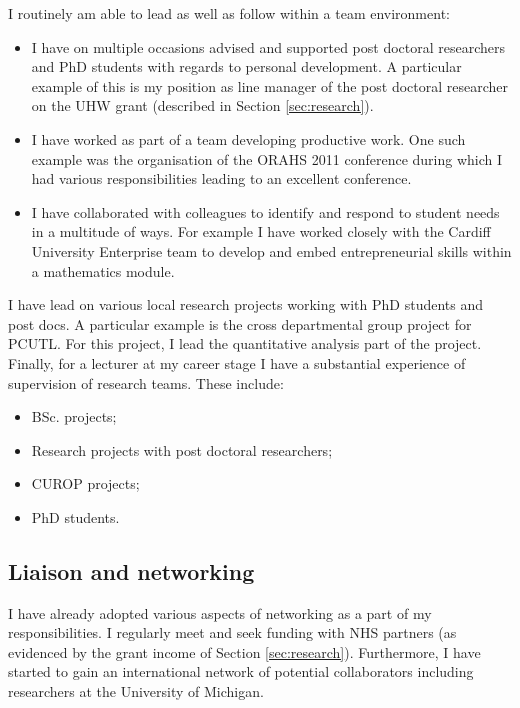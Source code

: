 \documentclass{article}
\begin{document}
I routinely am able to lead as well as follow within a team environment:

\begin{itemize}
    \item I have on multiple occasions advised and supported post doctoral researchers and PhD students with regards to personal development.
    A particular example of this is my position as line manager of the post doctoral researcher on the UHW grant (described in Section \ref{sec:research}).
    \item I have worked as part of a team developing productive work. One such example was the organisation of the ORAHS 2011 conference during which I had various responsibilities leading to an excellent conference.
    \item I have collaborated with colleagues to identify and respond to student needs in a multitude of ways.
    For example I have worked closely with the Cardiff University Enterprise team to develop and embed entrepreneurial skills within a mathematics module.
\end{itemize}

I have lead on various local research projects working with PhD students and post docs.
A particular example is the cross departmental group project for PCUTL.
For this project, I lead the quantitative analysis part of the project.
Finally, for a lecturer at my career stage I have a substantial experience of supervision of research teams.
These include:

\begin{itemize}
    \item BSc. projects;
    \item Research projects with post doctoral researchers;
    \item CUROP projects;
    \item PhD students.
\end{itemize}

\subsection{Liaison and networking}

I have already adopted various aspects of networking as a part of my responsibilities.
I regularly meet and seek funding with NHS partners (as evidenced by the grant income of Section \ref{sec:research}).
Furthermore, I have started to gain an international network of potential collaborators including researchers at the University of Michigan.
\end{document}
